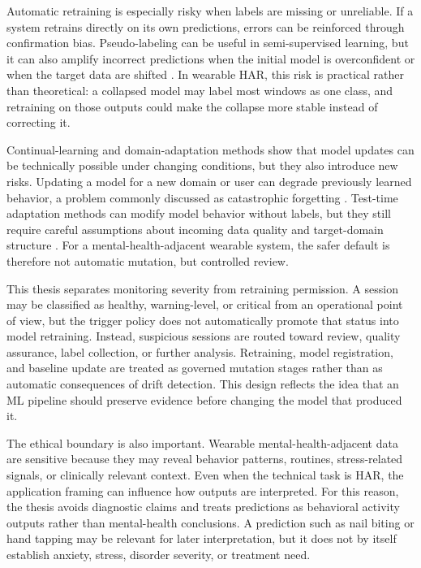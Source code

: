 Automatic retraining is especially risky when labels are missing or unreliable. If a system retrains directly on its own predictions, errors can be reinforced through confirmation bias. Pseudo-labeling can be useful in semi-supervised learning, but it can also amplify incorrect predictions when the initial model is overconfident or when the target data are shifted \cite{lee2013pseudolabel,arazo2020pseudolabel}. In wearable HAR, this risk is practical rather than theoretical: a collapsed model may label most windows as one class, and retraining on those outputs could make the collapse more stable instead of correcting it.

Continual-learning and domain-adaptation methods show that model updates can be technically possible under changing conditions, but they also introduce new risks. Updating a model for a new domain or user can degrade previously learned behavior, a problem commonly discussed as catastrophic forgetting \cite{kirkpatrick2017ewc,jha2021continual}. Test-time adaptation methods can modify model behavior without labels, but they still require careful assumptions about incoming data quality and target-domain structure \cite{wang2021tent}. For a mental-health-adjacent wearable system, the safer default is therefore not automatic mutation, but controlled review.

This thesis separates monitoring severity from retraining permission. A session may be classified as healthy, warning-level, or critical from an operational point of view, but the trigger policy does not automatically promote that status into model retraining. Instead, suspicious sessions are routed toward review, quality assurance, label collection, or further analysis. Retraining, model registration, and baseline update are treated as governed mutation stages rather than as automatic consequences of drift detection. This design reflects the idea that an ML pipeline should preserve evidence before changing the model that produced it.

The ethical boundary is also important. Wearable mental-health-adjacent data are sensitive because they may reveal behavior patterns, routines, stress-related signals, or clinically relevant context. Even when the technical task is HAR, the application framing can influence how outputs are interpreted. For this reason, the thesis avoids diagnostic claims and treats predictions as behavioral activity outputs rather than mental-health conclusions. A prediction such as nail biting or hand tapping may be relevant for later interpretation, but it does not by itself establish anxiety, stress, disorder severity, or treatment need.

